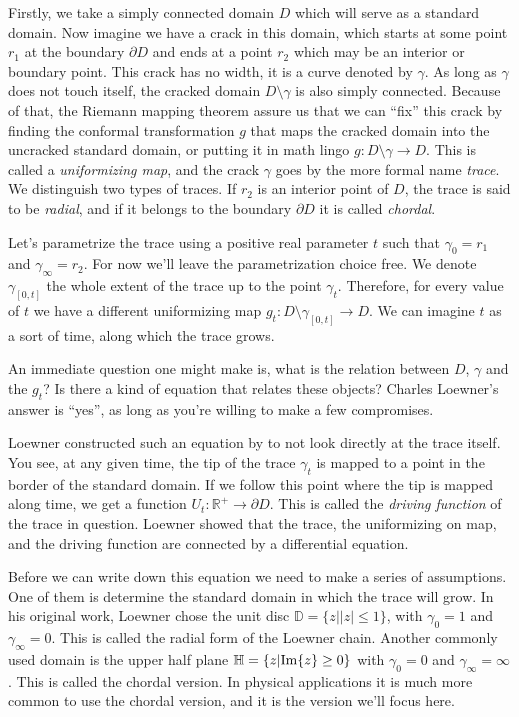 Firstly, we take a simply connected domain $D$ which will serve as a standard
domain. Now imagine we have a crack in this domain, which starts at some point
$r_1$ at the boundary $\partial D$ and ends at a point $r_2$ which may be an
interior or boundary point. This crack has no width, it is a curve denoted by
$\gamma$. As long as $\gamma$ does not touch itself, the cracked domain
$D\setminus\gamma$ is also simply connected. Because of that, the Riemann
mapping theorem assure us that we can ``fix'' this crack by finding the
conformal transformation $g$ that maps the cracked domain into the uncracked
standard domain, or putting it in math lingo $g:D\setminus\gamma\rightarrow D$.
This is called a \textit{uniformizing map}, and the crack  $\gamma$ goes by the
more formal name \textit{trace}. We distinguish two types of traces. If $r_2$
is an interior point of $D$, the trace is said to be \textit{radial}, and if it
belongs to the boundary $\partial D$ it is called \textit{chordal}.

Let's parametrize the trace using a positive real parameter $t$ such that
$\gamma_{0}=r_1$ and $\gamma_{\infty}=r_2$. For now we'll leave the
parametrization choice free. We denote $\gamma_{[0,t]}$ the whole extent of the
trace up to the point $\gamma_t$. Therefore, for every value of $t$ we have a
different uniformizing map $g_t:D\setminus\gamma_{[0,t]}\rightarrow D$. We can
imagine $t$ as a sort of time, along which the trace grows.

An immediate question one might make is, what is the relation between $D$,
$\gamma$ and the $g_t$? Is there a kind of equation that relates these objects?
Charles Loewner's answer is ``yes'', as long as you're willing to make a few
compromises.

Loewner constructed such an equation by to not look directly at the trace
itself. You see, at any given time, the tip of the trace $\gamma_t$ is mapped
to a point in the border of the standard domain. If we follow this point where
the tip is mapped along time, we get a function
$U_t:\mathbb{R}^+\rightarrow\partial D$. This is called the \textit{driving
function} of the trace in question. Loewner showed that the trace, the
uniformizing on map, and the driving function are connected by a differential
equation.

Before we can write down this equation we need to make a series of assumptions.
One of them is determine the standard domain in which the trace will grow. In
his original work, Loewner chose the unit disc $\mathbb{D}=\{z||z|\leq1\}$,
with $\gamma_0=1$ and $\gamma_\infty=0$. This is called the radial form of the
Loewner chain. Another commonly used domain is the upper half plane
$\mathbb{H}=\{z|\mbox{Im}\{z\}\geq0\}$ with $\gamma_0=0$ and $\gamma_\infty=\infty$.
This is called the chordal version. In physical applications it is much more
common to use the chordal version, and it is the version we'll focus here.

